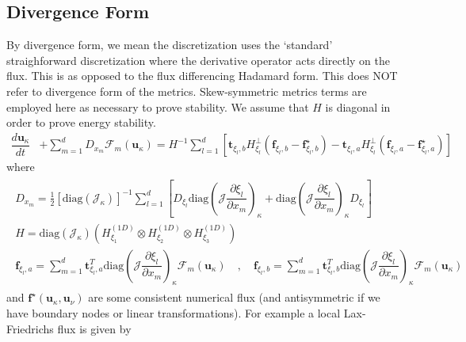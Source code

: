 \documentclass[12pt,a4paper]{article}
\newcommand{\pder}[2][]{\dfrac{\partial #1}{\partial #2}} %
\newcommand{\der}[2][]{\dfrac{d #1}{d #2}} %
\newcommand{\fn}[1]{\mathcal{#1}} %
\newcommand{\fnb}[1]{\bm{\mathcal{#1}}} %
\begin{document}
\subsection{Divergence Form}

By divergence form, we mean the discretization uses the `standard' straighforward discretization where the derivative operator acts directly on the flux. This is as opposed to the flux differencing Hadamard form. This does NOT refer to divergence form of the metrics. Skew-symmetric metrics terms are employed here as necessary to prove stability. We assume that $H$ is diagonal in order to prove energy stability.
\begin{align*}
\der[\bm{u}_\kappa]{t} &+ \sum_{m=1}^d D_{x_m} \fnb{F}_m \left( \bm{u}_\kappa \right) = H^{-1} \sum_{l = 1}^d \left[  \bm{t}_{\xi_l,b} H^{\bot}_{\xi_l} \left(\bm{f}_{\xi_l,b} - \bm{f}^\star_{\xi_l,b} \right)  - \bm{t}_{\xi_l,a} H^{\bot}_{\xi_l} \left(\bm{f}_{\xi_l,a} - \bm{f}^\star_{\xi_l,a}  \right) \right]
\end{align*}
where
\begin{align*}
\begin{gathered}
D_{x_m} = \frac{1}{2} \left[ \text{diag}\left( \fn{J}_\kappa \right) \right]^{-1} \sum_{l=1}^d \left[ D_{\xi_l} \text{diag} \left( \fn{J} \pder[\xi_l]{x_m} \right)_\kappa + \text{diag} \left( \fn{J} \pder[\xi_l]{x_m} \right)_\kappa  D_{\xi_l} \right] \\
 H = \text{diag} \left( \fn{J}_\kappa \right) \left( H_{\xi_1}^{(1D)} \otimes H_{\xi_2}^{(1D)}  \otimes H_{\xi_3}^{(1D)}  \right) \\
\bm{f}_{\xi_l,a} =  \sum_{m=1}^d \bm{t}^T_{\xi_l,a} \text{diag} \left( \fn{J} \pder[\xi_l]{x_m} \right)_{\kappa} \fnb{F}_m \left( \bm{u}_\kappa \right) \quad , \quad \bm{f}_{\xi_l,b} = \sum_{m=1}^d \bm{t}^T_{\xi_l,b} \text{diag} \left( \fn{J} \pder[\xi_l]{x_m} \right)_{\kappa} \fnb{F}_m \left( \bm{u}_\kappa \right)
\end{gathered}
\end{align*}
and $\bm{f}^\star \left( \bm{u}_\kappa , \bm{u}_\nu \right) $ are some consistent numerical flux (and antisymmetric if we have boundary nodes or linear transformations). For example a local Lax-Friedrichs flux is given by
\end{document}
